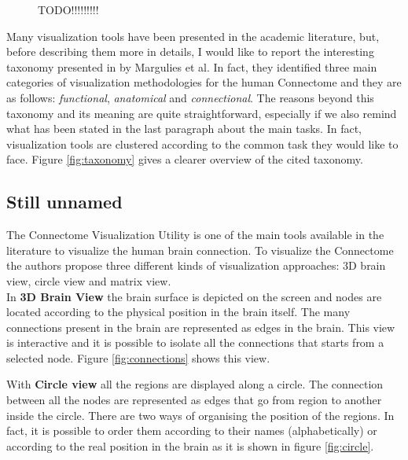 \documentclass{article}
\begin{document}
\begin{multicols}{2}
\begin{figure}[ht]
		
	\caption{TODO!!!!!!!!!}
\end{figure}

Many visualization tools have been presented in the academic literature, but, before describing them more in details, I would like to report the interesting taxonomy presented in \cite{visualizingHumanConnectome} by Margulies et al. In fact, they identified three main categories of visualization methodologies for the human Connectome and they are as follows: \textit{functional}, \textit{anatomical} and \textit{connectional}. The reasons beyond this taxonomy and its meaning are quite straightforward, especially if we also remind what has been stated in the last paragraph about the main tasks. In fact, visualization tools are clustered according to the common task they would like to face. Figure \ref{fig:taxonomy} gives a clearer overview of the cited taxonomy. 




\subsection{Still unnamed}
The Connectome Visualization Utility \cite{connectomeVisualizationUtility} is one of the main tools available in the literature to visualize the human brain connection. To visualize the Connectome the authors propose three different kinds of visualization approaches: 3D brain view, circle view and matrix view.\\
In \textbf{3D Brain View} the brain surface is depicted on the screen and nodes are located according to the physical position in the brain itself. The many connections present in the brain are represented as edges in the brain. This view is interactive and it is possible to isolate all the connections that starts from a selected node. Figure \ref{fig:connections} shows this view.



With \textbf{Circle view} all the regions are displayed along a circle. The connection between all the nodes are represented as edges that go from region to another inside the circle. There are two ways of organising the position of the regions. In fact, it is possible to order them according to their names (alphabetically) or according to the real position in the brain as it is shown in figure \ref{fig:circle}.


\end{multicols}
\end{document}
